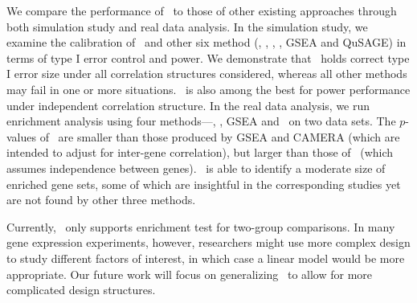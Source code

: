 	We compare the performance of \OurMethod~to those of other existing approaches through both 
	simulation study and real data analysis. In the simulation study, we examine the calibration 
	of \OurMethod~and other six method (\gent, \genr, \CMT, \CMR, GSEA and QuSAGE) in terms of type 
	I error control and power. We demonstrate that \OurMethod~holds correct type I error size under 
	all correlation structures considered, whereas all other methods may fail in one or more 
	situations. \OurMethod~is also among the best for power performance under  
	independent correlation structure.
	 In the real data analysis, we run enrichment analysis using four 
	 methods---\OurMethod, \CMT, GSEA and \genr~on two data sets.
	The $p$-values of \OurMethod~are smaller than those produced by 
	 GSEA and CAMERA (which are intended to adjust for inter-gene correlation), but 
	 larger than those of \genr~(which assumes independence between genes).
	 \OurMethod~is able to identify a moderate size of enriched gene 
	 sets, some of which are insightful in the corresponding studies yet are not found by other 
	 three methods.
	
	Currently, \OurMethod~only supports enrichment test for two-group comparisons. In
	many gene expression experiments, however, researchers might use more complex design to study
	different factors of interest, in which case a linear model would be more appropriate. Our
	future work will focus on generalizing \OurMethod~to allow for more complicated design 
	structures. 
	

